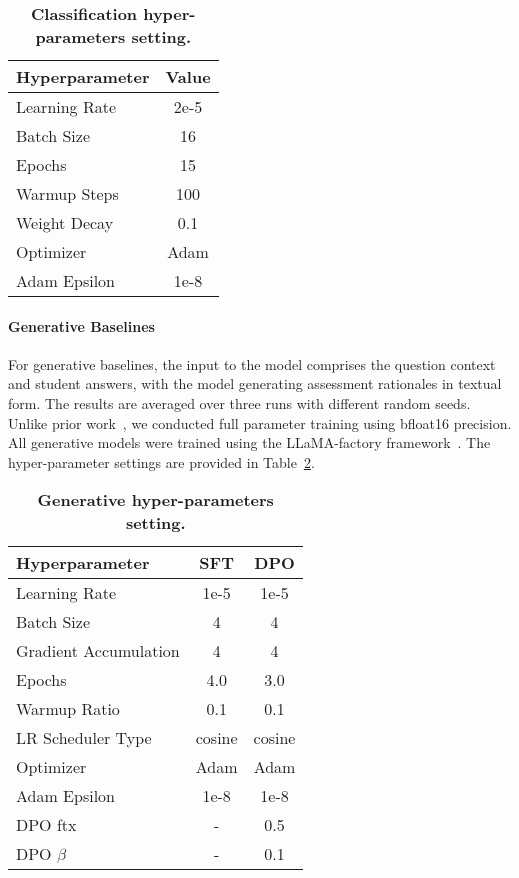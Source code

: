 \begin{table}[h]
\small
\centering
\begin{tabular}{|l|c|}
\hline
\textbf{Hyperparameter} & \textbf{Value} \\
\hline
Learning Rate          & 2e-5          \\
Batch Size             & 16            \\
Epochs                 & 15            \\
Warmup Steps           & 100           \\
Weight Decay           & 0.1           \\
Optimizer              & Adam          \\
Adam Epsilon           & 1e-8          \\
\hline
\end{tabular}
\caption{\small\textbf{Classification hyper-parameters setting.}}
\label{tab:hyperparameters_classification}
\end{table}

\paragraph{Generative Baselines} For generative baselines, the input to the model comprises the question context and student answers, with the model generating assessment rationales in textual form. The results are averaged over three runs with different random seeds. Unlike prior work~\cite{li_emnlp2024}, we conducted full parameter training using bfloat16 precision. All generative models were trained using the LLaMA-factory framework~\cite{zheng-etal-2024-llamafactory}. The hyper-parameter settings are provided in Table~\ref{tab:hyperparameters_generative}.

\begin{table}[h]
\small
\centering
\begin{tabular}{|l|c|c|}
\hline
\textbf{Hyperparameter} & \textbf{SFT} & \textbf{DPO} \\
\hline
Learning Rate          & 1e-5     & 1e-5        \\
Batch Size             & 4        & 4           \\
Gradient Accumulation  & 4        & 4           \\
Epochs                 & 4.0      & 3.0         \\
Warmup Ratio           & 0.1      & 0.1         \\
LR Scheduler Type      & cosine   & cosine     \\
Optimizer              & Adam     & Adam       \\
Adam Epsilon           & 1e-8     & 1e-8        \\
DPO ftx                & -        & 0.5         \\
DPO $\beta$            & -        & 0.1         \\
\hline
\end{tabular}
\caption{\small\textbf{Generative hyper-parameters setting.}}
\label{tab:hyperparameters_generative}
\end{table}

